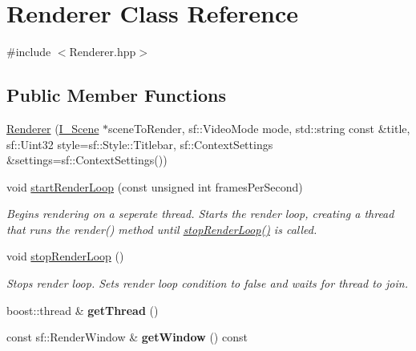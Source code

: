 \hypertarget{class_renderer}{}\section{Renderer Class Reference}
\label{class_renderer}


{\ttfamily \#include $<$Renderer.\+hpp$>$}

\subsection*{Public Member Functions}
\begin{DoxyCompactItemize}
\item 
\hyperlink{class_renderer_a2ba0ddcb6c8e9dfa55597ce954904658}{Renderer} (\hyperlink{class_i___scene}{I\+\_\+\+Scene} $\ast$scene\+To\+Render, sf\+::\+Video\+Mode mode, std\+::string const \&title, sf\+::\+Uint32 style=sf\+::\+Style\+::\+Titlebar, sf\+::\+Context\+Settings \&settings=sf\+::\+Context\+Settings())
\item 
\hypertarget{class_renderer_accec1290b82472463245b2b0951f9b7e}{}void \hyperlink{class_renderer_accec1290b82472463245b2b0951f9b7e}{start\+Render\+Loop} (const unsigned int frames\+Per\+Second)\label{class_renderer_accec1290b82472463245b2b0951f9b7e}

\begin{DoxyCompactList}\small\item\em Begins rendering on a seperate thread. Starts the render loop, creating a thread that runs the render() method until \hyperlink{class_renderer_a2b74ad924c28903c23b4a56a5dd1f1c1}{stop\+Render\+Loop()} is called. \end{DoxyCompactList}\item 
\hypertarget{class_renderer_a2b74ad924c28903c23b4a56a5dd1f1c1}{}void \hyperlink{class_renderer_a2b74ad924c28903c23b4a56a5dd1f1c1}{stop\+Render\+Loop} ()\label{class_renderer_a2b74ad924c28903c23b4a56a5dd1f1c1}

\begin{DoxyCompactList}\small\item\em Stops render loop. Sets render loop condition to false and waits for thread to join. \end{DoxyCompactList}\item 
\hypertarget{class_renderer_ae88515046970dac719ff9afd5f66a94d}{}boost\+::thread \& {\bfseries get\+Thread} ()\label{class_renderer_ae88515046970dac719ff9afd5f66a94d}

\item 
\hypertarget{class_renderer_a9dcd1bf73a74a0bdc9ee9fd96468fb43}{}const sf\+::\+Render\+Window \& {\bfseries get\+Window} () const \label{class_renderer_a9dcd1bf73a74a0bdc9ee9fd96468fb43}


\end{DoxyCompactItemize}
